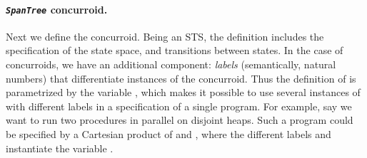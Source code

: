 \paragraph{\emph{\texttt{SpanTree}} concurroid.~~}
\label{sec:graph-conc-coher}


Next we define the  concurroid. Being an STS, the
definition includes the specification of the state space, and
transitions between states. In the case of concurroids, we have an
additional component: \emph{labels} (semantically, natural numbers)
that differentiate instances of the concurroid. Thus the
definition of  is parametrized by the variable
, which makes it possible to use several instances of
 with different labels in a specification of a single
program. For example, say we want to run two  procedures
in parallel on disjoint heaps. Such a program could be specified by a
Cartesian product of  and ,
where the different labels  and  instantiate the
variable .


